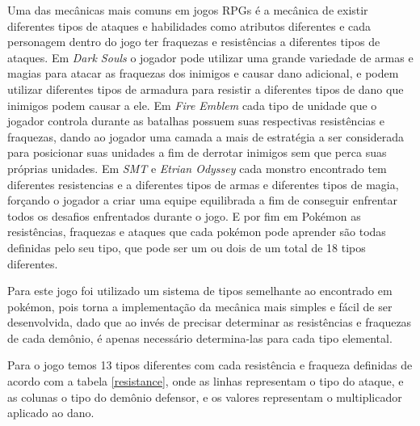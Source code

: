 \documentclass[
	12pt,				%
	openright,			%
	twoside,			%
	a4paper,			%
	english,			%
	french,				%
	spanish,			%
	brazil				%
	]{abntex2}
\begin{document}
Uma das mecânicas mais comuns em jogos RPGs é a mecânica de existir diferentes tipos de ataques e habilidades como atributos diferentes e cada personagem dentro do jogo ter fraquezas e resistências a diferentes tipos de ataques. Em \emph{Dark Souls} o jogador pode utilizar uma grande variedade de armas e magias para atacar as fraquezas dos inimigos e causar dano adicional, e podem utilizar diferentes tipos de armadura para resistir a diferentes tipos de dano que inimigos podem causar a ele. Em \emph{Fire Emblem} cada tipo de unidade que o jogador controla durante as batalhas possuem suas respectivas resistências e fraquezas, dando ao jogador uma camada a mais de estratégia a ser considerada para posicionar suas unidades a fim de derrotar inimigos sem que perca suas próprias unidades. Em \emph{SMT} e \emph{Etrian Odyssey} cada monstro encontrado tem diferentes resistencias e  a diferentes tipos de armas e diferentes tipos de magia, forçando o jogador a criar uma equipe equilibrada a fim de conseguir enfrentar todos os desafios enfrentados durante o jogo. E por fim em Pokémon as resistências, fraquezas e ataques que cada pokémon pode aprender são todas definidas pelo seu tipo, que pode ser um ou dois de um total de 18 tipos diferentes.

Para este jogo foi utilizado um sistema de tipos semelhante ao encontrado em pokémon, pois torna a implementação da mecânica mais simples e fácil de ser desenvolvida, dado que ao invés de precisar determinar as resistências e fraquezas de cada demônio, é apenas necessário determina-las para cada tipo elemental.

Para o jogo temos 13 tipos diferentes com cada resistência e fraqueza definidas de acordo com a tabela \ref{resistance}, onde as linhas representam o tipo do ataque, e as colunas o tipo do demônio defensor, e os valores representam o multiplicador aplicado ao dano.
\end{document}

